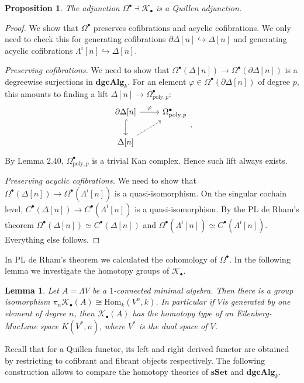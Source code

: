 \documentclass[psamsfonts]{amsart}
\newtheorem{prop}{Proposition}[section]
\newtheorem{lem}{Lemma}[section]
\theoremstyle{definition}
\newcommand{\sSet}{\mathbf{sSet}}
\newcommand{\dgcAlg}{\mathbf{dgcAlg}}
\newcommand{\Hom}{\mathrm{Hom}}
\numberwithin{equation}{section}
\begin{document}
\begin{prop}
The adjunction $\Omega^\bullet\dashv\mathcal{K}_\bullet$ is a Quillen adjunction.
\end{prop}
\begin{proof}
We show that $\Omega^\bullet$ preserves cofibrations and acyclic cofibrations. We only need to check this for generating cofibrations $\partial\Delta[n]\hookrightarrow\Delta[n]$ and generating acyclic cofibrations $\Lambda^i[n]\hookrightarrow\Delta[n]$.
\medbreak

\textit{Preserving cofibrations.} We need to show that $\Omega^\bullet(\Delta[n])\to\Omega^\bullet(\partial\Delta[n])$ is a degreewise surjections in $\dgcAlg_k$. For an element $\varphi\in\Omega^\bullet(\partial\Delta[n])$ of degree $p$, this amounts to finding a lift $\Delta[n]\to\Omega^\bullet_{\textrm{poly},p}$:
\[\begin{tikzcd}
\partial\Delta[n]\arrow[d,hookrightarrow]\arrow[r,"\varphi"]&\Omega^\bullet_{\textrm{poly},p}\\
\Delta[n]\arrow[ur,dashed]
\end{tikzcd}.\]
By Lemma 2.40, $\Omega^\bullet_{\textrm{poly},p}$ is a trivial Kan complex. Hence such lift always exists.\medbreak

\textit{Preserving acyclic cofibrations.} We need to show that $\Omega^\bullet(\Delta[n])\to\Omega^\bullet(\Lambda^i[n])$ is a quasi-isomorphism. On the singular cochain level, $C^\bullet(\Delta[n])\to C^\bullet(\Lambda^i[n])$ is a quasi-isomorphism. By the PL de Rham's theorem $\Omega^\bullet(\Delta[n])\simeq C^\bullet(\Delta[n])$ and $\Omega^\bullet(\Lambda^i[n])\simeq C^\bullet(\Lambda^i[n])$. Everything else follows.
\end{proof}

In PL de Rham's theorem we calculated the cohomology of $\Omega^\bullet$. In the following lemma we investigate the homotopy groups of $\mathcal{K}_\bullet$.

\begin{lem}
Let $A=\Lambda V$ be a $1$-connected minimal algebra. Then there is a group isomorphism $\pi_n\mathcal{K}_\bullet(A)\cong\Hom_k(V^n,k)$. In particular if $V $is generated by one element of degree $n$, then $\mathcal{K}_\bullet(A)$ has the homotopy type of an Eilenberg-MacLane space $K(V^\ast,n)$, where $V^\ast$ is the dual space of $V$.
\end{lem}

Recall that for a Quillen functor, its left and right derived functor are obtained by restricting to cofibrant and fibrant objects respectively. The following construction allows to compare the homotopy theories of $\sSet$ and $\dgcAlg_k$.
\end{document}
